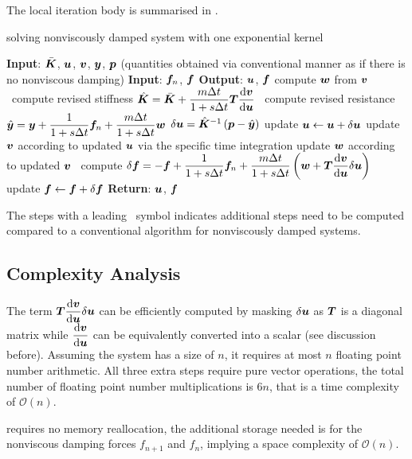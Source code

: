 The local iteration body is summarised in .
\begin{breakablealgorithm}
\caption{solving nonviscously damped system with one exponential kernel}\label{algo:single_model}
\begin{algorithmic}
\State \textbf{Input}: $\bar{\bm{K}}$, $\bm{u}$, $\bm{v}$, $\bm{y}$, $\bm{p}$ (quantities obtained via conventional manner as if there is no nonviscous damping)
\State \textbf{Input}: $\bm{f}_n$, $\bm{f}$
\State \textbf{Output}: $\bm{u}$, $\bm{f}$
\State compute $\bm{w}$ from $\bm{v}$
\State \faMicrochip~compute revised stiffness $\hat{\bm{K}}=\bar{\bm{K}}+\dfrac{m\Delta{}t}{1+s\Delta{}t}\bm{T}\dfrac{\mathrm{d}\bm{v}}{\mathrm{d}\bm{u}}$
\State \faMicrochip~compute revised resistance $\hat{\bm{y}}=\bm{y}+\dfrac{1}{1+s\Delta{}t}\bm{f}_n+\dfrac{m\Delta{}t}{1+s\Delta{}t}\bm{w}$
\State $\delta\bm{u}=\hat{\bm{K}}^{-1}\left(\bm{p}-\hat{\bm{y}}\right)$
\State update $\bm{u}\leftarrow\bm{u}+\delta\bm{u}$
\State update $\bm{v}$ according to updated $\bm{u}$ via the specific time integration
\State update $\bm{w}$ according to updated $\bm{v}$
\State \faMicrochip~compute $\delta\bm{f}=-\bm{f}+\dfrac{1}{1+s\Delta{}t}\bm{f}_n+\dfrac{m\Delta{}t}{1+s\Delta{}t}\left(\bm{w}+\bm{T}\dfrac{\mathrm{d}\bm{v}}{\mathrm{d}\bm{u}}\delta\bm{u}\right)$
\State update $\bm{f}\leftarrow\bm{f}+\delta\bm{f}$
\State \textbf{Return}: $\bm{u}$, $\bm{f}$
\end{algorithmic}
\end{breakablealgorithm}
The steps with a leading \faMicrochip~symbol indicates additional steps need to be computed compared to a conventional algorithm for nonviscously damped systems.
\subsection{Complexity Analysis}
The term $\bm{T}\dfrac{\mathrm{d}\bm{v}}{\mathrm{d}\bm{u}}\delta\bm{u}$ can be efficiently computed by masking $\delta\bm{u}$ as $\bm{T}$ is a diagonal matrix while $\dfrac{\mathrm{d}\bm{v}}{\mathrm{d}\bm{u}}$ can be equivalently converted into a scalar (see discussion before). Assuming the system has a size of $n$, it requires at most $n$ floating point number arithmetic. All three extra steps require pure vector operations, the total number of floating point number multiplications is $6n$, that is a time complexity of $\mathcal{O}\left(n\right)$.

 requires no memory reallocation, the additional storage needed is for the nonviscous damping forces $f_{n+1}$ and $f_n$, implying a space complexity of $\mathcal{O}\left(n\right)$.
